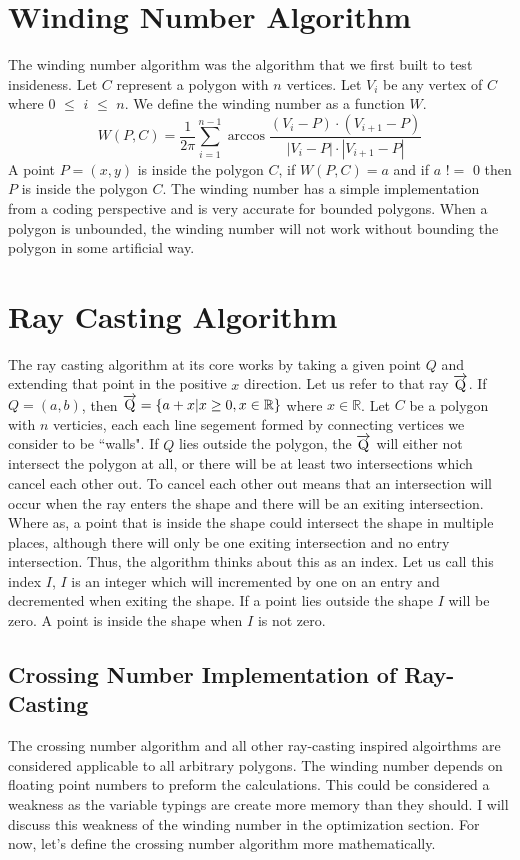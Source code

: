 \documentclass{article}
\begin{document}
\section{Winding Number Algorithm}
The winding number algorithm was the algorithm that we first built to test insideness.
Let $C$ represent a polygon with $n$ vertices.
Let $V_i$ be any vertex of $C$ where $0$ $\leq$ $i$ $\leq$ $n$.
We define the winding number as a function $W$.
$$
W(P,C) = \frac{1}{2\pi}\sum_{i=1}^{n-1}\arccos{\frac{(V_i-P)\cdot (V_{i+1}-P)}{|V_i-P|\cdot |V_{i+1}-P|}}
$$
A point $P = (x,y)$ is inside the polygon $C$, if $W(P,C) = a$ and  if $a$ $!=$ $0$ then $P$ is inside the polygon $C$.
The winding number has a simple implementation from a coding perspective and is very accurate for bounded polygons.
When a polygon is unbounded, the winding number will not work without bounding the polygon in some artificial way.

\section{Ray Casting Algorithm}

The ray casting algorithm at its core works by taking a given point $Q$ and extending that point in the positive $x$ direction.
Let us refer  to that ray $\overrightarrow{\rm Q}$.
If $Q = (a,b)$, then $\overrightarrow{\rm Q} = \{ a + x | x \geq 0, x \in \mathbb{R} \}$ where $x \in \mathbb{R}$.
Let $C$ be a polygon with $n$ verticies, each each line segement formed by connecting vertices we consider to be ``walls".
If $Q$ lies outside the polygon, the $\overrightarrow{\rm Q}$ will either not intersect the polygon at all, or there will be at least two intersections which cancel each other out.
To cancel each other out means that an intersection will occur when the ray enters the shape and there will be an exiting intersection.
Where as, a point that is inside the shape could intersect the shape in multiple places, although there will only be one exiting intersection and no entry intersection.
Thus, the algorithm thinks about this as an index.
Let us call this index $I$, $I$ is an integer which will incremented by one on an entry and decremented when exiting the shape.
If a point lies outside the shape $I$ will be zero.
A point is inside the shape when $I$ is not zero.

\subsection{Crossing Number Implementation of Ray-Casting}
The crossing number algorithm and all other ray-casting inspired algoirthms are considered applicable to all arbitrary polygons\cite{arb_polys}.
The winding number depends on floating point numbers to preform the calculations\cite{arb_polys}.
This could be considered a weakness as the variable typings are create more memory than they should.
I will discuss this weakness of the winding number in the optimization section.
For now, let's define the crossing number algorithm more mathematically.
\end{document}
